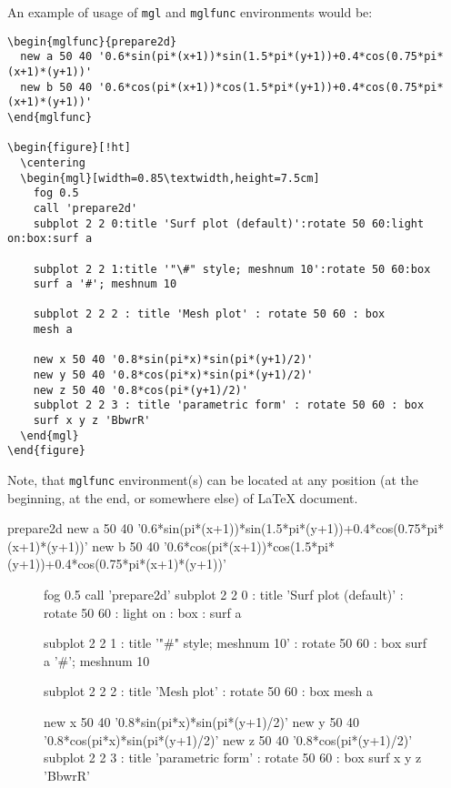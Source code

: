 \documentclass[12pt]{article}
\begin{document}
An example of usage of \texttt{mgl} and \texttt{mglfunc} environments would be:
\begin{verbatim}
\begin{mglfunc}{prepare2d}
  new a 50 40 '0.6*sin(pi*(x+1))*sin(1.5*pi*(y+1))+0.4*cos(0.75*pi*(x+1)*(y+1))'
  new b 50 40 '0.6*cos(pi*(x+1))*cos(1.5*pi*(y+1))+0.4*cos(0.75*pi*(x+1)*(y+1))'
\end{mglfunc}

\begin{figure}[!ht]
  \centering
  \begin{mgl}[width=0.85\textwidth,height=7.5cm]
    fog 0.5
    call 'prepare2d'
    subplot 2 2 0:title 'Surf plot (default)':rotate 50 60:light on:box:surf a

    subplot 2 2 1:title '"\#" style; meshnum 10':rotate 50 60:box
    surf a '#'; meshnum 10

    subplot 2 2 2 : title 'Mesh plot' : rotate 50 60 : box
    mesh a

    new x 50 40 '0.8*sin(pi*x)*sin(pi*(y+1)/2)'
    new y 50 40 '0.8*cos(pi*x)*sin(pi*(y+1)/2)'
    new z 50 40 '0.8*cos(pi*(y+1)/2)'
    subplot 2 2 3 : title 'parametric form' : rotate 50 60 : box
    surf x y z 'BbwrR'
  \end{mgl}
\end{figure}
\end{verbatim}
Note, that \texttt{mglfunc} environment(s) can be located at any position (at the beginning, at the end, or somewhere else) of LaTeX document.
\begin{mglfunc}{prepare2d}
  new a 50 40 '0.6*sin(pi*(x+1))*sin(1.5*pi*(y+1))+0.4*cos(0.75*pi*(x+1)*(y+1))'
  new b 50 40 '0.6*cos(pi*(x+1))*cos(1.5*pi*(y+1))+0.4*cos(0.75*pi*(x+1)*(y+1))'
\end{mglfunc}

\begin{figure}[!ht]
  \centering
  \begin{mgl}[width=0.85\textwidth,height=7.5cm]
    fog 0.5
    call 'prepare2d'
    subplot 2 2 0 : title 'Surf plot (default)' : rotate 50 60 : light on : box : surf a

    subplot 2 2 1 : title '"\#" style; meshnum 10' : rotate 50 60 : box
    surf a '#'; meshnum 10

    subplot 2 2 2 : title 'Mesh plot' : rotate 50 60 : box
    mesh a

    new x 50 40 '0.8*sin(pi*x)*sin(pi*(y+1)/2)'
    new y 50 40 '0.8*cos(pi*x)*sin(pi*(y+1)/2)'
    new z 50 40 '0.8*cos(pi*(y+1)/2)'
    subplot 2 2 3 : title 'parametric form' : rotate 50 60 : box
    surf x y z 'BbwrR'
  \end{mgl}
\end{figure}
\end{document}
